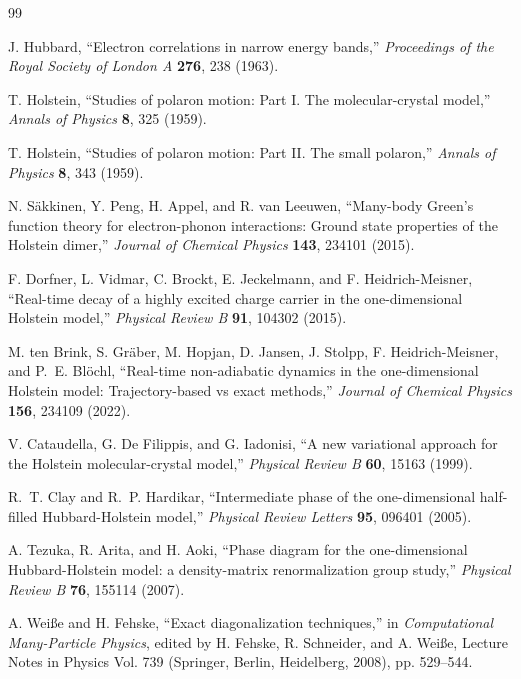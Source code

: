 \documentclass[
  reprint,
  amsmath,
  amssymb,
  aps,
  pra,
  nofootinbib,
  superscriptaddress,
  floatfix
]{revtex4-2}
\begin{document}
\clearpage
\begin{thebibliography}{99}

J. Hubbard,
``Electron correlations in narrow energy bands,''
\emph{Proceedings of the Royal Society of London A} \textbf{276}, 238 (1963).

T. Holstein,
``Studies of polaron motion: Part I. The molecular-crystal model,''
\emph{Annals of Physics} \textbf{8}, 325 (1959).

T. Holstein,
``Studies of polaron motion: Part II. The small polaron,''
\emph{Annals of Physics} \textbf{8}, 343 (1959).

N. S\"akkinen, Y. Peng, H. Appel, and R. van Leeuwen,
``Many-body Green's function theory for electron-phonon interactions: Ground state properties of the Holstein dimer,''
\emph{Journal of Chemical Physics} \textbf{143}, 234101 (2015).

F. Dorfner, L. Vidmar, C. Brockt, E. Jeckelmann, and F. Heidrich-Meisner,
``Real-time decay of a highly excited charge carrier in the one-dimensional Holstein model,''
\emph{Physical Review B} \textbf{91}, 104302 (2015).

M. ten Brink, S. Gr\"aber, M. Hopjan, D. Jansen, J. Stolpp, F. Heidrich-Meisner, and P.~E. Bl\"ochl,
``Real-time non-adiabatic dynamics in the one-dimensional Holstein model: Trajectory-based vs exact methods,''
\emph{Journal of Chemical Physics} \textbf{156}, 234109 (2022).

V. Cataudella, G. De Filippis, and G. Iadonisi,
``A new variational approach for the Holstein molecular-crystal model,''
\emph{Physical Review B} \textbf{60}, 15163 (1999).

R.~T. Clay and R.~P. Hardikar,
``Intermediate phase of the one-dimensional half-filled Hubbard-Holstein model,''
\emph{Physical Review Letters} \textbf{95}, 096401 (2005).

A. Tezuka, R. Arita, and H. Aoki,
``Phase diagram for the one-dimensional Hubbard-Holstein model: a density-matrix renormalization group study,''
\emph{Physical Review B} \textbf{76}, 155114 (2007).

A. Wei{\ss}e and H. Fehske,
``Exact diagonalization techniques,''
in \emph{Computational Many-Particle Physics},
edited by H. Fehske, R. Schneider, and A. Wei{\ss}e,
Lecture Notes in Physics Vol. 739 (Springer, Berlin, Heidelberg, 2008), pp. 529--544.


\end{thebibliography}
\end{document}
